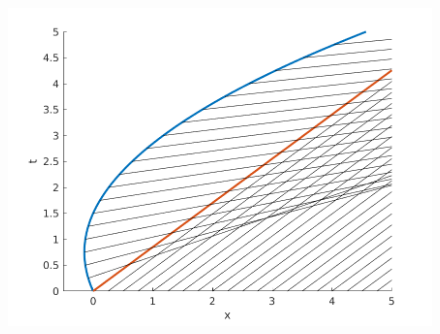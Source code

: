 \documentclass{article}
\begin{document}
\begin{figure}
    \includegraphics[width=40em]{as09fig1}
    \centering
\end{figure}
\end{document}
